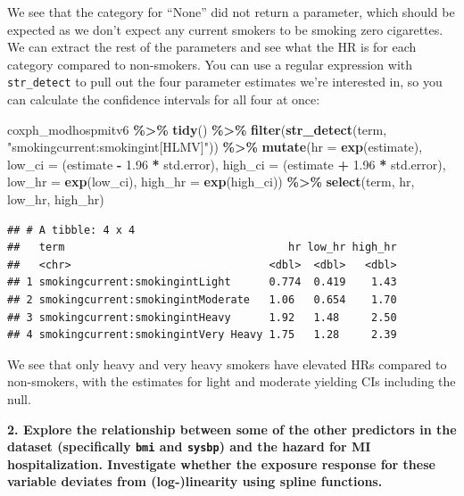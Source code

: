 \documentclass[
]{book}
\newenvironment{Shaded}{\begin{snugshade}}{\end{snugshade}}
\newcommand{\AttributeTok}[1]{\textcolor[rgb]{0.13,0.29,0.53}{#1}}
\newcommand{\FloatTok}[1]{\textcolor[rgb]{0.00,0.00,0.81}{#1}}
\newcommand{\FunctionTok}[1]{\textcolor[rgb]{0.13,0.29,0.53}{\textbf{#1}}}
\newcommand{\NormalTok}[1]{#1}
\newcommand{\SpecialCharTok}[1]{\textcolor[rgb]{0.81,0.36,0.00}{\textbf{#1}}}
\newcommand{\StringTok}[1]{\textcolor[rgb]{0.31,0.60,0.02}{#1}}
\begin{document}
We see that the category for ``None'' did not return a parameter, which should be expected as we don't expect any current smokers to be smoking zero cigarettes. We can extract the rest of the parameters and see what the HR is for each category compared to non-smokers. You can use a regular expression with \texttt{str\_detect} to pull out the four parameter estimates we're interested in, so you can calculate the confidence intervals for all four at once:

\begin{Shaded}
\begin{Highlighting}[]
\NormalTok{coxph\_modhospmitv6 }\SpecialCharTok{\%\textgreater{}\%} 
  \FunctionTok{tidy}\NormalTok{() }\SpecialCharTok{\%\textgreater{}\%} 
  \FunctionTok{filter}\NormalTok{(}\FunctionTok{str\_detect}\NormalTok{(term, }\StringTok{"smokingcurrent:smokingint[HLMV]"}\NormalTok{)) }\SpecialCharTok{\%\textgreater{}\%} 
  \FunctionTok{mutate}\NormalTok{(}\AttributeTok{hr =} \FunctionTok{exp}\NormalTok{(estimate),}
         \AttributeTok{low\_ci =}\NormalTok{ (estimate }\SpecialCharTok{{-}} \FloatTok{1.96} \SpecialCharTok{*}\NormalTok{ std.error), }
         \AttributeTok{high\_ci =}\NormalTok{ (estimate }\SpecialCharTok{+} \FloatTok{1.96} \SpecialCharTok{*}\NormalTok{ std.error), }
         \AttributeTok{low\_hr =} \FunctionTok{exp}\NormalTok{(low\_ci), }
         \AttributeTok{high\_hr =} \FunctionTok{exp}\NormalTok{(high\_ci)) }\SpecialCharTok{\%\textgreater{}\%} 
  \FunctionTok{select}\NormalTok{(term, hr, low\_hr, high\_hr)}
\end{Highlighting}
\end{Shaded}

\begin{verbatim}
## # A tibble: 4 x 4
##   term                                   hr low_hr high_hr
##   <chr>                               <dbl>  <dbl>   <dbl>
## 1 smokingcurrent:smokingintLight      0.774  0.419    1.43
## 2 smokingcurrent:smokingintModerate   1.06   0.654    1.70
## 3 smokingcurrent:smokingintHeavy      1.92   1.48     2.50
## 4 smokingcurrent:smokingintVery Heavy 1.75   1.28     2.39
\end{verbatim}

We see that only heavy and very heavy smokers have elevated HRs compared to non-smokers, with the estimates for light and moderate yielding CIs including the null.

\textbf{2. Explore the relationship between some of the other predictors in the dataset (specifically \texttt{bmi} and \texttt{sysbp}) and the hazard for MI hospitalization. Investigate whether the exposure response for these variable deviates from (log-)linearity using spline functions.}
\end{document}
